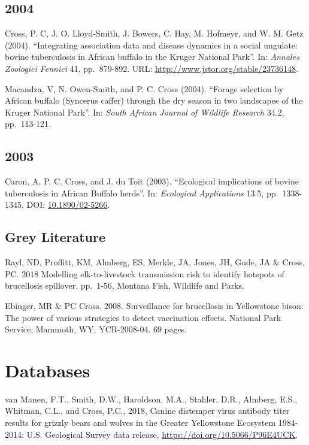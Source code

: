 \documentclass[12pt,]{article}
\begin{document}
\hypertarget{section-15}{%
\subsection{2004}\label{section-15}}

Cross, P. C, J. O. Lloyd-Smith, J. Bowers, C. Hay, M. Hofmeyr, and W. M.
Getz (2004). ``Integrating association data and disease dynamics in a
social ungulate: bovine tuberculosis in African buffalo in the Kruger
National Park''. In: \emph{Annales Zoologici Fennici} 41, pp.~879-892.
URL: \url{http://www.jstor.org/stable/23736148}.

Macandza, V, N. Owen-Smith, and P. C. Cross (2004). ``Forage selection
by African buffalo (Syncerus caffer) through the dry season in two
landscapes of the Kruger National Park''. In: \emph{South African
Journal of Wildlife Research} 34.2, pp.~113-121.

\hypertarget{section-16}{%
\subsection{2003}\label{section-16}}

Caron, A, P. C. Cross, and J. du Toit (2003). ``Ecological implications
of bovine tuberculosis in African Buffalo herds''. In: \emph{Ecological
Applications} 13.5, pp.~1338-1345. DOI:
\href{https://doi.org/10.1890\%2F02-5266}{10.1890/02-5266}.

\hypertarget{grey-literature}{%
\subsection{Grey Literature}\label{grey-literature}}

Rayl, ND, Proffitt, KM, Almberg, ES, Merkle, JA, Jones, JH, Gude, JA \&
Cross, PC. 2018 Modelling elk-to-livestock transmission risk to identify
hotspots of brucellosis spillover. pp.~1-56, Montana Fish, Wildlife and
Parks.

Ebinger, MR \& PC Cross. 2008. Surveillance for brucellosis in
Yellowstone bison: The power of various strategies to detect vaccination
effects. National Park Service, Mammoth, WY, YCR-2008-04. 69 pages.

\hypertarget{databases}{%
\section{Databases}\label{databases}}

van Manen, F.T., Smith, D.W., Haroldson, M.A., Stahler, D.R., Almberg,
E.S., Whitman, C.L., and Cross, P.C., 2018, Canine distemper virus
antibody titer results for grizzly bears and wolves in the Greater
Yellowstone Ecosystem 1984-2014: U.S. Geological Survey data release,
\url{https://doi.org/10.5066/P96E4UCK}.
\end{document}
